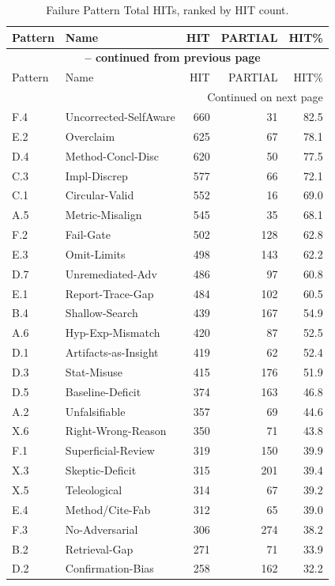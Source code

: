 \begin{longtable}{llrrr}
\caption{Failure Pattern Total HITs, ranked by HIT count.} \label{tab:appendix_total_hits} \\
\toprule
Pattern & Name & HIT & PARTIAL & HIT\% \\
\midrule
\endfirsthead
\multicolumn{5}{c}{{\bfseries \tablename\ \thetable{} -- continued from previous page}} \\
\toprule
Pattern & Name & HIT & PARTIAL & HIT\% \\
\midrule
\endhead
\midrule
\multicolumn{5}{r}{{Continued on next page}} \\
\endfoot
\bottomrule
\endlastfoot
F.4 & Uncorrected-SelfAware & 660 & 31 & 82.5 \\
E.2 & Overclaim & 625 & 67 & 78.1 \\
D.4 & Method-Concl-Disc & 620 & 50 & 77.5 \\
C.3 & Impl-Discrep & 577 & 66 & 72.1 \\
C.1 & Circular-Valid & 552 & 16 & 69.0 \\
A.5 & Metric-Misalign & 545 & 35 & 68.1 \\
F.2 & Fail-Gate & 502 & 128 & 62.8 \\
E.3 & Omit-Limits & 498 & 143 & 62.2 \\
D.7 & Unremediated-Adv & 486 & 97 & 60.8 \\
E.1 & Report-Trace-Gap & 484 & 102 & 60.5 \\
B.4 & Shallow-Search & 439 & 167 & 54.9 \\
A.6 & Hyp-Exp-Mismatch & 420 & 87 & 52.5 \\
D.1 & Artifacts-as-Insight & 419 & 62 & 52.4 \\
D.3 & Stat-Misuse & 415 & 176 & 51.9 \\
D.5 & Baseline-Deficit & 374 & 163 & 46.8 \\
A.2 & Unfalsifiable & 357 & 69 & 44.6 \\
X.6 & Right-Wrong-Reason & 350 & 71 & 43.8 \\
F.1 & Superficial-Review & 319 & 150 & 39.9 \\
X.3 & Skeptic-Deficit & 315 & 201 & 39.4 \\
X.5 & Teleological & 314 & 67 & 39.2 \\
E.4 & Method/Cite-Fab & 312 & 65 & 39.0 \\
F.3 & No-Adversarial & 306 & 274 & 38.2 \\
B.2 & Retrieval-Gap & 271 & 71 & 33.9 \\
D.2 & Confirmation-Bias & 258 & 162 & 32.2 \\

\end{longtable}
